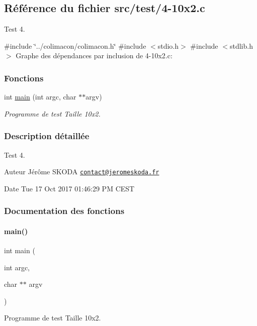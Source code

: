 \hypertarget{4-10x2_8c}{}\subsection{Référence du fichier src/test/4-\/10x2.c}
\label{4-10x2_8c}


Test 4.  


{\ttfamily \#include \char`\"{}../colimacon/colimacon.\+h\char`\"{}}\newline
{\ttfamily \#include $<$stdio.\+h$>$}\newline
{\ttfamily \#include $<$stdlib.\+h$>$}\newline
Graphe des dépendances par inclusion de 4-\/10x2.c\+:
\subsubsection*{Fonctions}
\begin{DoxyCompactItemize}
\item 
int \hyperlink{4-10x2_8c_a3c04138a5bfe5d72780bb7e82a18e627}{main} (int argc, char $\ast$$\ast$argv)
\begin{DoxyCompactList}\small\item\em Programme de test Taille 10x2. \end{DoxyCompactList}\end{DoxyCompactItemize}


\subsubsection{Description détaillée}
Test 4. 

\begin{DoxyAuthor}{Auteur}
Jérôme S\+K\+O\+DA \href{mailto:contact@jeromeskoda.fr}{\tt contact@jeromeskoda.\+fr} 
\end{DoxyAuthor}
\begin{DoxyDate}{Date}
Tue 17 Oct 2017 01\+:46\+:29 PM C\+E\+ST 
\end{DoxyDate}


\subsubsection{Documentation des fonctions}
\mbox{\label{4-10x2_8c_a3c04138a5bfe5d72780bb7e82a18e627}} 
\paragraph{\texorpdfstring{main()}{main()}}
{\footnotesize\ttfamily int main (\begin{DoxyParamCaption}\item[{int}]{argc,  }\item[{char $\ast$$\ast$}]{argv }\end{DoxyParamCaption})}



Programme de test Taille 10x2. 

